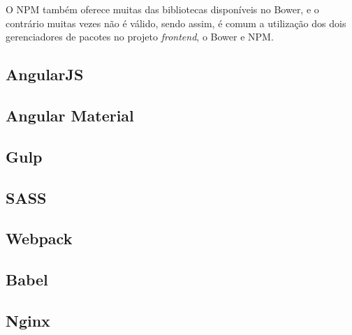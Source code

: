 O NPM também oferece muitas das bibliotecas disponíveis no Bower, e o contrário muitas vezes não é válido, sendo assim, é comum a utilização dos dois gerenciadores de pacotes no projeto \textit{frontend}, o Bower e NPM.

\subsection{AngularJS}


\subsection{Angular Material}


\subsection{Gulp}


\subsection{SASS}


\subsection{Webpack}


\subsection{Babel}


\subsection{Nginx}